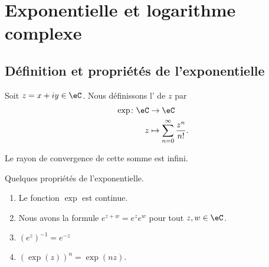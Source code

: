\section{Exponentielle et logarithme complexe}

\subsection{Définition et propriétés de l'exponentielle}

\begin{definition}  \label{DefJilXoM}
    Soit \( z=x+iy\in \eC\). Nous définissons l' de \( z\) par
    \begin{equation}
        \begin{aligned}
            \exp\colon \eC&\to \eC \\
            z&\mapsto \sum_{n=0}^{\infty}\frac{ z^n }{ n! }.
        \end{aligned}
    \end{equation}
\end{definition}
Le rayon de convergence de cette somme est infini.

\begin{proposition}     \label{PropdDjisy}
    Quelques propriétés de l'exponentielle.
    \begin{enumerate}
        \item
            Le fonction \( \exp\) est continue.
        \item       \label{ITEMooRLHCooJTuYKV}
            Nous avons la formule \(  e^{z+w}= e^{z}e^w\) pour tout \( z,w\in \eC\).
        \item
            \( (e^z)^{-1}= e^{-z}\)
        \item
            \( (\exp(z))^n=\exp(nz)\).
    \end{enumerate}
\end{proposition}


